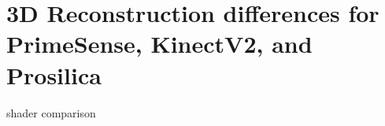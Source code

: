 \section{3D Reconstruction differences for PrimeSense, KinectV2, and Prosilica}
shader comparison
%
%
%
%
%
%
%































